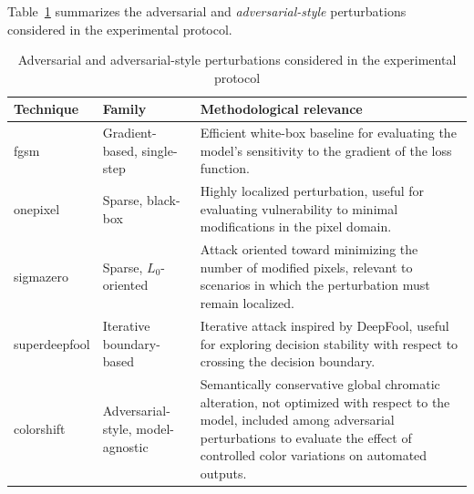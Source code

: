 Table~\ref{tab:background_attack_families} summarizes the adversarial and
\textit{adversarial-style} perturbations considered in the experimental
protocol.

\begin{table}[htbp]
    \centering
    \small
    \renewcommand{\arraystretch}{1.25}
    \begin{tabularx}{\textwidth}{@{}l l X@{}}
        \toprule
        \textbf{Technique} & \textbf{Family} & \textbf{Methodological relevance} \\
        \midrule
        \gls{fgsm} &
        Gradient-based, single-step &
        Efficient white-box baseline for evaluating the model's sensitivity
        to the gradient of the loss function. \\
        \gls{onepixel} &
        Sparse, black-box &
        Highly localized perturbation, useful for evaluating vulnerability to
        minimal modifications in the pixel domain. \\
        \gls{sigmazero} &
        Sparse, \(L_0\)-oriented &
        Attack oriented toward minimizing the number of modified pixels,
        relevant to scenarios in which the perturbation must remain localized. \\
        \gls{superdeepfool} &
        Iterative boundary-based &
        Iterative attack inspired by DeepFool, useful for exploring decision
        stability with respect to crossing the decision boundary. \\
        \gls{colorshift} &
        Adversarial-style, model-agnostic &
        Semantically conservative global chromatic alteration, not optimized
        with respect to the model, included among adversarial perturbations to
        evaluate the effect of controlled color variations on automated
        outputs. \\
        \bottomrule
    \end{tabularx}
    \caption{Adversarial and adversarial-style perturbations considered in the experimental protocol}
    \label{tab:background_attack_families}
\end{table}



